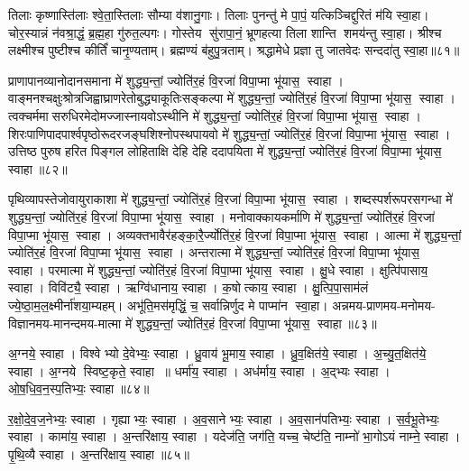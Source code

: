 तिलाः कृष्णास्ति॑लाः श्वे॒ता॒स्तिलाः सौम्या व॑शानु॒गाः। 
तिलाः पुनन्तु॑ मे पा॒पं॒ यत्किञ्चिद्दुरितं म॑यि स्वा॒हा। 
चोर॒स्यान्नं न॑वश्रा॒द्धं॒ ब्र॒ह्म॒हा गु॑रुत॒ल्पगः। 
गोस्तेय सु॑रापा॒नं॒ भ्रूणहत्या तिला शान्ति शमय॑न्तु स्वा॒हा। 
श्रीश्च लक्ष्मीश्च पुष्टीश्च कीर्तिं॑ चानृ॒ण्यताम्। 
ब्रह्मण्यं ब॑हुपु॒त्रताम्। 
श्रद्धामेधे प्रज्ञा तु जातवेदः सन्ददा॑तु स्वा॒हा॥८१॥
 \anuvakamend

प्राणापानव्यानोदानसमाना मे॑ शुद्ध्य॒न्तां॒ ज्योति॑र॒हं वि॒रजा॑ विपा॒प्मा भू॑यास॒ स्वाहा।
वाङ्मनश्चक्षुःश्रोत्रजिह्वाघ्राणरेतो\-बुद्ध्याकूतिः\-सङ्कल्पा मे॑ शुद्ध्य॒न्तां॒ ज्योति॑र॒हं वि॒रजा॑ विपा॒प्मा भू॑यास॒ स्वाहा। 
त्वक्चर्ममासरुधिरमेदोमज्जास्नायवो\-ऽस्थीनि  मे॑ शुद्ध्य॒न्तां॒ ज्योति॑र॒हं वि॒रजा॑ विपा॒प्मा भू॑यास॒ स्वाहा। 
शिरःपाणिपादपार्श्वपृष्ठोरूदरजङ्घशिश्नोपस्थपायवो  मे॑ शुद्ध्य॒न्तां॒ ज्योति॑र॒हं वि॒रजा॑ विपा॒प्मा भू॑यास॒ स्वाहा।
उत्तिष्ठ पुरुष हरित पिङ्गल लोहिताक्षि देहि देहि ददापयिता मे॑ शुद्ध्य॒न्तां॒ ज्योति॑र॒हं वि॒रजा॑ विपा॒प्मा भू॑यास॒ स्वाहा॥८२॥ 
\anuvakamend

पृथिव्यापस्तेजोवायुराकाशा मे॑ शुद्ध्य॒न्तां॒ ज्योति॑र॒हं वि॒रजा॑ विपा॒प्मा भू॑यास॒ स्वाहा। 
शब्दस्पर्शरूपरसगन्धा  मे॑ शुद्ध्य॒न्तां॒ ज्योति॑र॒हं वि॒रजा॑ विपा॒प्मा भू॑यास॒ स्वाहा। 
मनोवाक्कायकर्माणि  मे॑ शुद्ध्य॒न्तां॒ ज्योति॑र॒हं वि॒रजा॑ विपा॒प्मा भू॑यास॒ स्वाहा। 
अव्यक्तभावैर॑हङ्का॒रै॒र्ज्योति॑र॒हं वि॒रजा॑ विपा॒प्मा भू॑यास॒ स्वाहा। 
आत्मा मे॑ शुद्ध्य॒न्तां॒ ज्योति॑र॒हं वि॒रजा॑ विपा॒प्मा भू॑यास॒ स्वाहा। 
अन्तरात्मा मे॑ शुद्ध्य॒न्तां॒ ज्योति॑र॒हं वि॒रजा॑ विपा॒प्मा भू॑यास॒ स्वाहा। 
परमात्मा  मे॑ शुद्ध्य॒न्तां॒ ज्योति॑र॒हं वि॒रजा॑ विपा॒प्मा भू॑यास॒ स्वाहा। 
क्षु॒धे स्वाहा। 
क्षुत्पि॑पासाय॒ स्वाहा। 
विवि॑ट्यै॒ स्वाहा। 
ऋग्वि॑धानाय॒ स्वाहा। 
क॒षोत्काय॒ स्वाहा। 
क्षु॒त्पि॒पा॒साम॑लं ज्ये॒ष्ठा॒म॒ल॒क्ष्मीर्ना॑शया॒म्यहम्। 
अभू॑ति॒मस॑मृद्धिं॒ च॒ सर्वान्निर्णुद मे पाप्मा॑न स्वा॒हा।
अन्नमय-प्राणमय-मनोमय-विज्ञानमय-मानन्दमय-मात्मा मे॑ शुद्ध्य॒न्तां॒ ज्योति॑र॒हं वि॒रजा॑ विपा॒प्मा भू॑यास॒ स्वाहा॥८३॥
\anuvakamend

अ॒ग्नये॒ स्वाहा। 
विश्वेभ्यो दे॒वेभ्यः॒ स्वाहा। 
ध्रु॒वाय॑ भू॒माय॒ स्वाहा। 
ध्रु॒व॒क्षित॑ये॒ स्वाहा। 
अ॒च्यु॒त॒क्षित॑ये॒ स्वाहा। 
अ॒ग्नये स्विष्ट॒कृते॒ स्वाहा ॥ 
धर्मा॑य॒ स्वाहा। 
अध॑र्माय॒ स्वाहा। 
अ॒द्भ्यः स्वाहा। 
ओ॒ष॒धि॒व॒न॒स्प॒तिभ्यः॒ स्वाहा॥८४॥ 


र॒क्षो॒दे॒व॒ज॒नेभ्यः॒ स्वाहा। 
गृह्याभ्यः॒ स्वाहा। 
अ॒व॒सानेभ्यः॒ स्वाहा। 
अ॒व॒सान॑पतिभ्यः॒ स्वाहा। 
स॒र्व॒भू॒तेभ्यः॒ स्वाहा। 
कामा॑य॒ स्वाहा। 
अ॒न्तरि॑क्षाय॒ स्वाहा। 
यदेज॑ति॒ जग॑ति॒ यच्च॒ चेष्ट॑ति॒ नाम्नो॑ भा॒गोऽयं नाम्ने॒ स्वाहा। 
पृ॒थि॒व्यै स्वाहा। 
अ॒न्तरि॑क्षाय॒ स्वाहा॥८५॥ 


